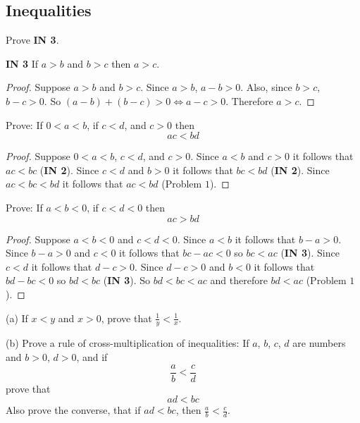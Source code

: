 \subsection{Inequalities}

\begin{tcolorbox}[title=Problem 1, breakable]
    Prove \textbf{IN 3}.
\end{tcolorbox}

\textbf{IN 3} If $a > b$ and $b > c$ then $a > c$.

\begin{proof}
    Suppose $a > b$ and $b > c$.
    Since $a > b$, $a - b > 0$.
    Also, since $b > c$, $b - c > 0$.
    So $(a - b) + (b - c) > 0 \iff a - c > 0$.
    Therefore $a > c$.
\end{proof}

\begin{tcolorbox}[title=Problem 2, breakable]
    Prove: If $0 < a < b$, if $c < d$, and $c > 0$ then
    \[ac < bd\]
\end{tcolorbox}

\begin{proof}
    Suppose $0 < a < b$, $c < d$, and $c > 0$.
    Since $a < b$ and $c > 0$ it follows that $ac < bc$ (\textbf{IN 2}).
    Since $c < d$ and  $b > 0$ it follows that $bc < bd$ (\textbf{IN 2}).
    Since $ac < bc < bd$ it follows that $ac < bd$ (Problem $1$).
\end{proof}

\begin{tcolorbox}[title=Problem 3, breakable]
    Prove: If $a < b < 0$, if $c < d < 0$ then 
    \[ac > bd\]
\end{tcolorbox}

\begin{proof}
    Suppose $a < b < 0$ and $c < d < 0$.
    Since $a < b$ it follows that $b - a > 0$.
    Since $b - a > 0$ and $c < 0$ it follows that $bc - ac < 0$ so $bc < ac$ (\textbf{IN 3}).
    Since $c < d$ it follows that $d - c > 0$.
    Since $d - c > 0$ and $b < 0$ it follows that $bd - bc < 0$ so $bd < bc$ (\textbf{IN 3}).
    So $bd < bc < ac$ and therefore $bd < ac$ (Problem $1$).
\end{proof}

\begin{tcolorbox}[title=Problem 4, breakable]
    (a) If $x < y$ and $x > 0$, prove that $\frac{1}{y} < \frac{1}{x}$.

    (b) Prove a rule of cross-multiplication of inequalities: If $a$, $b$, $c$, $d$
    are numbers and $b > 0$, $d > 0$, and if 
    \[\frac{a}{b} < \frac{c}{d}\]
    prove that 
    \[ad < bc\]
    Also prove the converse, that if $ad < bc$, then $\frac{a}{b} < \frac{c}{d}$.
\end{tcolorbox}


